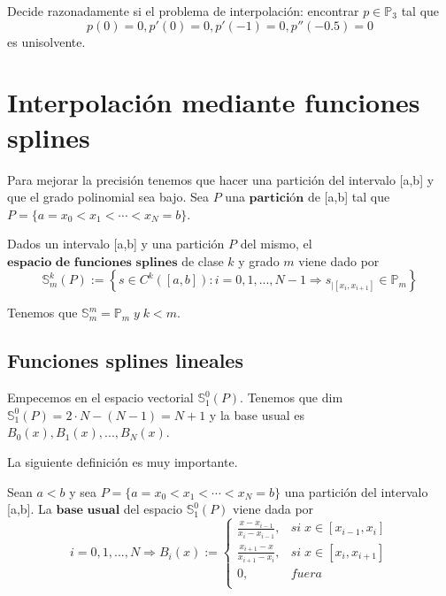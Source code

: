 \begin{ejer}
Decide razonadamente si el problema de interpolación: encontrar $p \in \mathbb{P}_3$ tal que
\[p(0)=0, p'(0)=0, p'(-1)=0, p''(-0.5)=0 \]
es unisolvente.
\end{ejer}

\section{Interpolación mediante funciones splines}
Para mejorar la precisión tenemos que hacer una partición del intervalo [a,b] y que el grado polinomial sea bajo. Sea $P$ una $\textbf{partición}$ de [a,b] tal que $P = \lbrace a=x_0 < x_1 < \cdots < x_N = b\rbrace$.

\begin{ndef}
Dados un intervalo [a,b] y una partición $P$ del mismo, el $\textbf{espacio de funciones splines}$ de clase $k$ y grado $m$ viene dado por
\[ \mathbb{S}_m^k(P) := \left\lbrace s \in C^k ( \left[ a,b \right] ) : i=0,1,...,N-1 \Rightarrow s_{\vert \left[ x_i, x_{i+1} \right]} \in \mathbb{P} _m \right\rbrace \]
\end{ndef}

Tenemos que $\mathbb{S}_m^m = \mathbb{P}_m \; y \; k<m$.

\subsection{Funciones splines lineales}
Empecemos en el espacio vectorial $\mathbb{S}_1^0(P)$. Tenemos que dim$\mathbb{S}_1^0(P) = 2\cdot N-(N-1) = N+1$ y la base usual es {$B_0(x),B_1(x),...,B_N(x)$}.

La siguiente definición es muy importante.

\begin{ndef}
Sean $a<b$ y sea $P = \lbrace a=x_0 < x_1 < \cdots < x_N = b\rbrace$ una partición del intervalo [a,b]. La $\textbf{base usual}$ del espacio $\mathbb{S}_1^0(P)$ viene dada por
\[ i=0,1,...,N \Rightarrow B_i(x) := \left\lbrace
\begin{array}{ll}
\frac{x-x_{i-1}}{x_i-x_{i-1}}, & si \; x \in \left[ x_{i-1},x_i \right] \\
\frac{x_{i+1}-x}{x_{i+1}-x_i}, & si \; x \in \left[ x_i,x_{i+1} \right] \\
0, & fuera \\
\end{array}
\right.
\]
\end{ndef}

